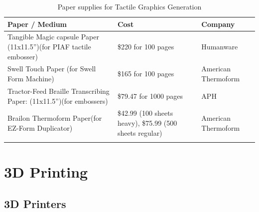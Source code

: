 \documentclass[14pt, letterpaper,twoside]{extreport}
\begin{document}
\begin{longtable}[]{@{}
    >{\raggedright\arraybackslash}p{}
    >{\raggedright\arraybackslash}p{}
    >{\raggedright\arraybackslash}p{}@{}
    }
    \toprule\noalign{}
    
    \textbf{Paper / Medium}                                                    & \textbf{Cost}                                            & \textbf{Company}    \\
    \midrule\noalign{}
    \endhead
    \bottomrule\noalign{}
    \endlastfoot
    Tangible Magic capsule Paper (11x11.5'')\break(for PIAF tactile embosser)  & \$220 for 100 pages                                      & Humanware           \\[1.0em]
    Swell Touch Paper \break (for Swell Form Machine)                          & \$165 for 100 pages                                      & American Thermoform \\[1.0em]
    Tractor-Feed Braille Transcribing Paper: (11x11.5'')\break (for embossers) & \$79.47 for 1000 pages                                   & APH                 \\[1.0em]
    Brailon Thermoform Paper\break (for EZ-Form Duplicator)                    & \$42.99 (100 sheets heavy), \$75.99 (500 sheets regular) & American Thermoform \\[1.0em]\hline
    \caption{ Paper supplies for Tactile Graphics Generation }
\end{longtable}


\pagebreak \hypertarget{d-printers}{%
    \chapter*{3D Printing}\label{d-printers}}
\pagebreak \hypertarget{d-print-equipment}{%
    \section*{3D Printers}\label{d-print-equipment}}

\end{document}
